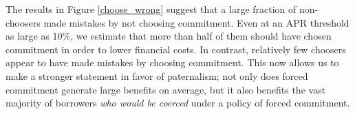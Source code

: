 \documentclass[oneside,11pt]{article}
\begin{document}
The results in Figure \ref{choose_wrong} suggest that a large fraction of non-choosers made mistakes by not choosing commitment.
Even at an APR threshold as large as 10\%, we estimate that more than half of them should have chosen commitment in order to lower financial costs.
In contrast, relatively few choosers appear to have made mistakes by choosing commitment.
This now allows us to make a stronger statement in favor of paternalism; not only does forced commitment generate large benefits on average, but it also benefits the vast majority of borrowers \emph{who would be coerced} under a policy of forced commitment.







\end{document}
